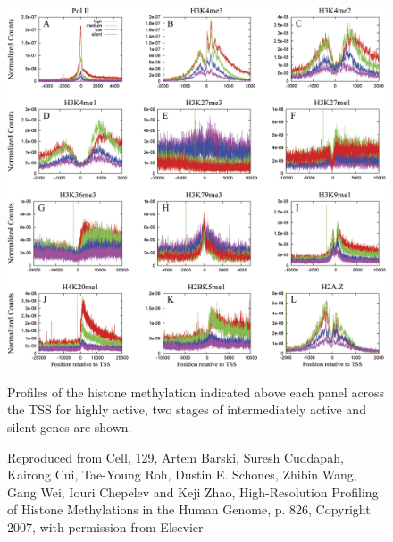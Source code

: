 \documentclass[12pt,a4paper]{article}
\begin{document}
\begin{figure}[p]
   \centering
   \includegraphics[width=\textwidth]{images/introduction/barski-histone-modifications-around-tss.jpeg}
   \caption{Profiles of the histone methylation indicated above each panel across the TSS for highly active, two stages of intermediately active and silent genes are shown.}
   \caption*{Reproduced from Cell, 129, Artem Barski, Suresh Cuddapah, Kairong Cui, Tae-Young Roh, Dustin E. Schones, Zhibin Wang, Gang Wei, Iouri Chepelev and Keji Zhao, High-Resolution Profiling of Histone Methylations in the Human Genome\cite{Barski:2007ww}, p. 826, Copyright 2007, with permission from Elsevier}
    \label{fig:barski_histone_profiles}
\end{figure}


\end{document}
